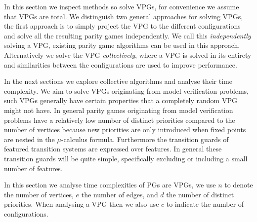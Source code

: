 In this section we inspect methods so solve VPGs, for convenience we assume that VPGs are total. We distinguish two general approaches for solving VPGs, the first approach is to simply project the VPG to the different configurations and solve all the resulting parity games independently. We call this \textit{independently} solving a VPG, existing parity game algorithms can be used in this approach. Alternatively we solve the VPG \textit{collectively}, where a VPG is solved in its entirety and similarities between the configurations are used to improve performance. 

In the next sections we explore collective algorithms and analyse their time complexity. We aim to solve VPGs originating from model verification problems, such VPGs generally have certain properties that a completely random VPG might not have. In general parity games originating from model verification problems have a relatively low number of distinct priorities compared to the number of vertices because new priorities are only introduced when fixed points are nested in the $\mu$-calculus formula. Furthermore the transition guards of featured transition systems are expressed over features. In general these transition guards will be quite simple, specifically excluding or including a small number of features.

In this section we analyse time complexities of PGs are VPGs, we use $n$ to denote the number of vertices, $e$ the number of edges, and $d$ the number of distinct priorities. When analysing a VPG then we also use $c$ to indicate the number of configurations.